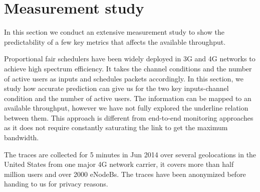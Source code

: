 \section{Measurement study}\label{sec:prediction}
In this section we conduct an extensive measurement study to show the predictability of a few key metrics that affects the available throughput. 

Proportional fair schedulers have been widely deployed in 3G and 4G networks to achieve high spectrum efficiency. It takes the channel conditions and the number of active users as inputs and schedules packets accordingly. In this section, we study how accurate prediction can give us for the two key inputs-channel condition and the number of active users. The information can be mapped to an available throughput, however we have not fully explored the underline relation between them. This approach is different from end-to-end monitoring approaches as it does not require constantly saturating the link to get the maximum bandwidth. 

The traces are collected for 5 minutes in Jun 2014 over several geolocations in the United States from one major 4G network carrier, it covers more than half million users and over 2000 eNodeBs. The traces have been anonymized before handing to us for privacy reasons. 

